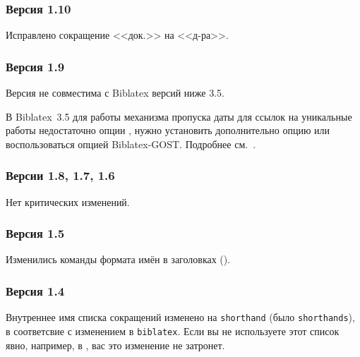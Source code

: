 \documentclass[10pt,a4paper,headings=small,numbers=enddot,english,russian]{ltxdockit}
\newcommand*{\biblatex}{Biblatex\xspace}
\newcommand*{\biblatexgost}{Biblatex-GOST\xspace}
\begin{document}
\subsubsection*{Версия 1.10}

\begin{trivlist}
\item Исправлено сокращение <<док.>> на <<д-ра>>.
\end{trivlist}

\subsubsection*{Версия 1.9}

\begin{trivlist}
\item Версия не совместима с \biblatex версий ниже 3.5.
\item В \biblatex~3.5 для работы механизма пропуска даты для ссылок на уникальные работы
  недостаточно опции , нужно установить дополнительно опцию
   или воспользоваться опцией \biblatexgost {}.
  Подробнее см.~. 
\end{trivlist}

\subsubsection*{Версии 1.8, 1.7, 1.6}

\begin{trivlist}
\item Нет критических изменений.
\end{trivlist}

\subsubsection*{Версия 1.5}

\begin{trivlist}
\item Изменились команды формата имён в
  заголовках ().
\end{trivlist}

\subsubsection*{Версия 1.4}

\begin{trivlist}
\item Внутреннее имя списка сокращений изменено на \texttt{shorthand} (было
  \texttt{shorthands}), в соответсвие с изменением в \texttt{biblatex}.
  Если вы не используете этот список явно, например, в , вас это
  изменение не затронет.
\end{trivlist}
\end{document}
